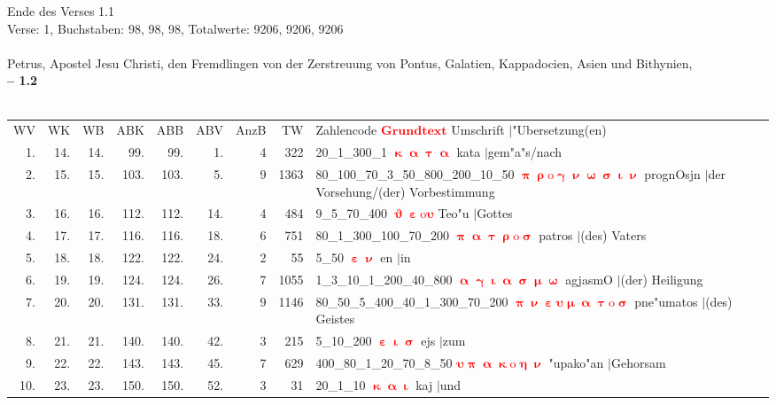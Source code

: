 \documentclass[a4paper,10pt,landscape]{article}
\begin{document}
Ende des Verses 1.1\\
Verse: 1, Buchstaben: 98, 98, 98, Totalwerte: 9206, 9206, 9206\\
\\
Petrus, Apostel Jesu Christi, den Fremdlingen von der Zerstreuung von Pontus, Galatien, Kappadocien, Asien und Bithynien,\\
\newpage 
{\bf -- 1.2}\\
\medskip \\
\begin{tabular}{rrrrrrrrp{120mm}}
WV&WK&WB&ABK&ABB&ABV&AnzB&TW&Zahlencode \textcolor{red}{$\boldsymbol{Grundtext}$} Umschrift $|$"Ubersetzung(en)\\
1.&14.&14.&99.&99.&1.&4&322&20\_1\_300\_1 \textcolor{red}{$\boldsymbol{\upkappa\upalpha\uptau\upalpha}$} kata $|$gem"a"s/nach\\
2.&15.&15.&103.&103.&5.&9&1363&80\_100\_70\_3\_50\_800\_200\_10\_50 \textcolor{red}{$\boldsymbol{\uppi\uprho\mathrm{o}\upgamma\upnu\upomega\upsigma\upiota\upnu}$} prognOsjn $|$der Vorsehung/(der) Vorbestimmung\\
3.&16.&16.&112.&112.&14.&4&484&9\_5\_70\_400 \textcolor{red}{$\boldsymbol{\upvartheta\upepsilon\mathrm{o}\upsilon}$} Teo"u $|$Gottes\\
4.&17.&17.&116.&116.&18.&6&751&80\_1\_300\_100\_70\_200 \textcolor{red}{$\boldsymbol{\uppi\upalpha\uptau\uprho\mathrm{o}\upsigma}$} patros $|$(des) Vaters\\
5.&18.&18.&122.&122.&24.&2&55&5\_50 \textcolor{red}{$\boldsymbol{\upepsilon\upnu}$} en $|$in\\
6.&19.&19.&124.&124.&26.&7&1055&1\_3\_10\_1\_200\_40\_800 \textcolor{red}{$\boldsymbol{\upalpha\upgamma\upiota\upalpha\upsigma\upmu\upomega}$} agjasmO $|$(der) Heiligung\\
7.&20.&20.&131.&131.&33.&9&1146&80\_50\_5\_400\_40\_1\_300\_70\_200 \textcolor{red}{$\boldsymbol{\uppi\upnu\upepsilon\upsilon\upmu\upalpha\uptau\mathrm{o}\upsigma}$} pne"umatos $|$(des) Geistes\\
8.&21.&21.&140.&140.&42.&3&215&5\_10\_200 \textcolor{red}{$\boldsymbol{\upepsilon\upiota\upsigma}$} ejs $|$zum\\
9.&22.&22.&143.&143.&45.&7&629&400\_80\_1\_20\_70\_8\_50 \textcolor{red}{$\boldsymbol{\upsilon\uppi\upalpha\upkappa\mathrm{o}\upeta\upnu}$} "upako"an $|$Gehorsam\\
10.&23.&23.&150.&150.&52.&3&31&20\_1\_10 \textcolor{red}{$\boldsymbol{\upkappa\upalpha\upiota}$} kaj $|$und\\

\end{tabular}
\end{document}
